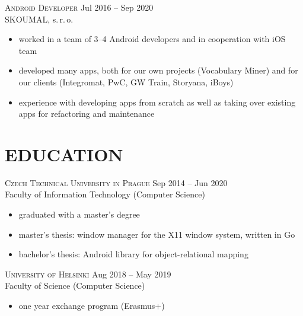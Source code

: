 \documentclass[margin]{res}
\begin{document}
\begin{resume}
        \vspace{5mm}

        \textsc{Android Developer} \hfill Jul 2016 -- Sep 2020\\
        SKOUMAL, s.\,r.\,o.
        \vspace{2mm}
        \begin{itemize}
            \item worked in a team of 3--4 Android developers and in cooperation with iOS team
            \item developed many apps, both for our own projects (Vocabulary Miner) and for our clients (Integromat, PwC, GW Train, Storyana, iBoys)
            \item experience with developing apps from scratch as well as taking over existing apps for refactoring and maintenance
        \end{itemize}


        \section{EDUCATION}
        \textsc{Czech Technical University in Prague} \hfill Sep 2014 -- Jun 2020\\
        Faculty of Information Technology (Computer Science)
        \vspace{2mm}
        \begin{itemize}
            \item graduated with a master's degree
            \item master's thesis: window manager for the X11 window system, written in Go
            \item bachelor's thesis: Android library for object-relational mapping
        \end{itemize}

        \vspace{5mm}

        \textsc{University of Helsinki} \hfill Aug 2018 -- May 2019\\
        Faculty of Science (Computer Science)
        \vspace{2mm}
        \begin{itemize}
            \item one year exchange program (Erasmus+)
        \end{itemize}


\end{resume}
\end{document}

